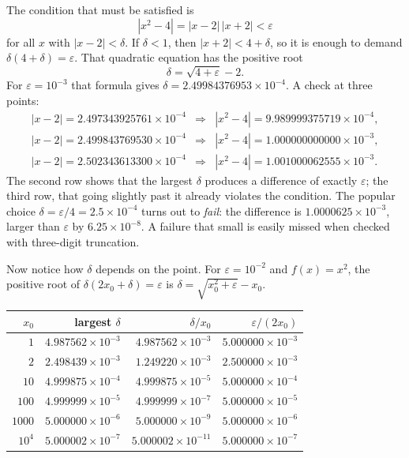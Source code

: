 The condition that must be satisfied is
\[
|x^{2}-4|=|x-2|\,|x+2|<\varepsilon
\]
for all $x$ with $|x-2|<\delta$. If $\delta<1$, then $|x+2|<4+\delta$,
so it is enough to demand $\delta(4+\delta)=\varepsilon$. That quadratic equation
has the positive root
\[
\delta=\sqrt{4+\varepsilon}-2 .
\]
For $\varepsilon=10^{-3}$ that formula gives $\delta=2.49984376953\times10^{-4}$.
A check at three points:
\[
\begin{array}{lll}
|x-2|=2.497343925761\times10^{-4} & \Rightarrow & |x^{2}-4|=9.989999375719\times10^{-4},\\
|x-2|=2.499843769530\times10^{-4} & \Rightarrow & |x^{2}-4|=1.000000000000\times10^{-3},\\
|x-2|=2.502343613300\times10^{-4} & \Rightarrow & |x^{2}-4|=1.001000062555\times10^{-3}.
\end{array}
\]
The second row shows that the largest $\delta$ produces a difference of exactly
$\varepsilon$; the third row, that going slightly past it already violates the condition.
The popular choice $\delta=\varepsilon/4=2.5\times10^{-4}$ turns out to \emph{fail}: the
difference is $1.0000625\times10^{-3}$, larger than $\varepsilon$ by $6.25\times10^{-8}$.
A failure that small is easily missed when checked with three-digit truncation.

Now notice how $\delta$ depends on the point. For
$\varepsilon=10^{-2}$ and $f(x)=x^{2}$, the positive root of $\delta(2x_{0}+\delta)=\varepsilon$
is $\delta=\sqrt{x_{0}^{2}+\varepsilon}-x_{0}$.

\begin{center}
\small
\begin{tabular}{rrrr}
\hline
$x_{0}$ & largest $\delta$ & $\delta/x_{0}$ & $\varepsilon/(2x_{0})$ \\
\hline
$1$ & $4.987562\times10^{-3}$ & $4.987562\times10^{-3}$ & $5.000000\times10^{-3}$ \\
$2$ & $2.498439\times10^{-3}$ & $1.249220\times10^{-3}$ & $2.500000\times10^{-3}$ \\
$10$ & $4.999875\times10^{-4}$ & $4.999875\times10^{-5}$ & $5.000000\times10^{-4}$ \\
$100$ & $4.999999\times10^{-5}$ & $4.999999\times10^{-7}$ & $5.000000\times10^{-5}$ \\
$1000$ & $5.000000\times10^{-6}$ & $5.000000\times10^{-9}$ & $5.000000\times10^{-6}$ \\
$10^{4}$ & $5.000002\times10^{-7}$ & $5.000002\times10^{-11}$ & $5.000000\times10^{-7}$ \\
\hline
\end{tabular}
\end{center}

